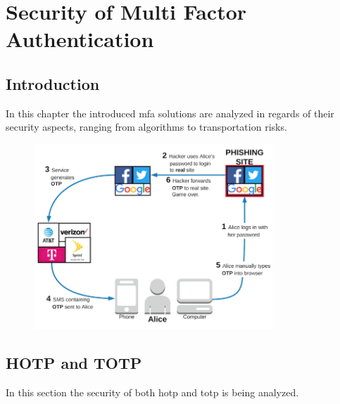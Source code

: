 \chapter{Security of Multi Factor Authentication}

\section{Introduction}

In this chapter the introduced \gls{mfa} solutions are analyzed in regards of their security aspects, ranging from algorithms to transportation risks.

\begin{figure}[hbt]
 	\centering
	\includegraphics[width=0.8\textwidth]{pics/06---phishing-attack-2.png}
	\caption{}
\end{figure}

\section{HOTP and TOTP}

In this section the security of both \gls{hotp} and \gls{totp} is being analyzed.


